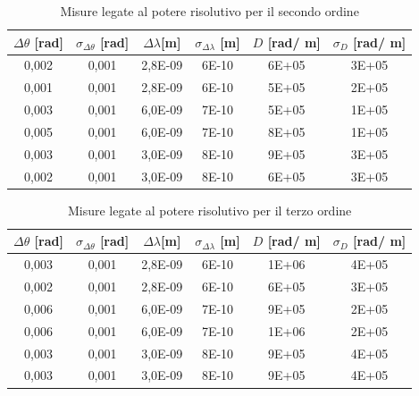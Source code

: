 \documentclass{article}
\begin{document}
        \begin{table}[H]
            \centering
            \begin{tabular}{c c c c c c }
                \toprule 
                $\Delta \theta$ [rad] &$\sigma_{\Delta \theta}$ [rad] & $\Delta \lambda$[m]  & $\sigma_{\Delta \lambda}$ [m] & $D$ [rad/ m] & $\sigma_D$ [rad/ m] \\
                \midrule
                0,002	&	0,001	&	2,8E-09	&	6E-10	&	6E+05	&	3E+05\\
                0,001	&	0,001	&	2,8E-09	&	6E-10	&	5E+05	&	2E+05\\
                0,003	&	0,001	&	6,0E-09	&	7E-10	&	5E+05	&	1E+05\\
                0,005	&	0,001	&	6,0E-09	&	7E-10	&	8E+05	&	1E+05\\
                0,003	&	0,001	&	3,0E-09	&	8E-10	&	9E+05	&	3E+05\\
                0,002	&	0,001	&	3,0E-09	&	8E-10	&	6E+05	&	3E+05\\
                \bottomrule
            \end{tabular}
            \caption{Misure legate al potere risolutivo per il secondo ordine}
            \label{D ordine 2}
        \end{table}

                
        \begin{table}[H]
            \centering
            \begin{tabular}{c c c c c c }
                \toprule 
                $\Delta \theta$ [rad] &$\sigma_{\Delta \theta}$ [rad] & $\Delta \lambda$[m]  & $\sigma_{\Delta \lambda}$ [m] & $D$ [rad/ m] & $\sigma_D$ [rad/ m] \\
                \midrule
                0,003	&	0,001	&	2,8E-09	&	6E-10	&	1E+06	&	4E+05\\
                0,002	&	0,001	&	2,8E-09	&	6E-10	&	6E+05	&	3E+05\\
                0,006	&	0,001	&	6,0E-09	&	7E-10	&	9E+05	&	2E+05\\
                0,006	&	0,001	&	6,0E-09	&	7E-10	&	1E+06	&	2E+05\\
                0,003	&	0,001	&	3,0E-09	&	8E-10	&	9E+05	&	4E+05\\
                0,003	&	0,001	&	3,0E-09	&	8E-10	&	9E+05	&	4E+05\\
                \bottomrule
            \end{tabular}
            \caption{Misure legate al potere risolutivo per il terzo ordine}
            \label{D ordine 3}
        \end{table}
\end{document}

